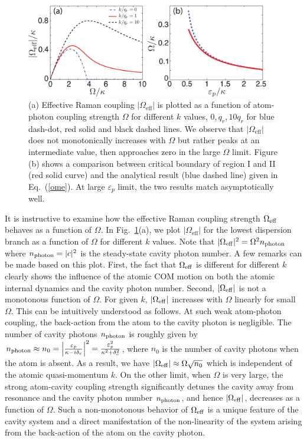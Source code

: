 \documentclass[atoms,article,submit,moreauthors,pdftex,12pt,a4paper]{mdpi}
\begin{document}
\begin{figure}[htp]
\includegraphics[width=0.95\textwidth]{fig2}\caption{(a) Effective Raman coupling $|\Omega_\text{eff}|$ is plotted as a function of atom-photon coupling strength $\Omega$ for different $k$ values, $0$,\,$q_r$,\,$10q_r$ for blue dash-dot, red solid and black dashed  lines. We observe that $|\Omega_\text{eff}|$ does not monotonically  increases with $\Omega$ but rather peaks at an intermediate value, then approaches zero in the large $\Omega$ limit. Figure (b) shows a comparison between critical boundary of region I and II (red solid curve) and the analytical result (blue dashed line) given in Eq.~(\ref{ome}). At large $\varepsilon_p$ limit, the two results match asymptotically well.  }\label{fig2}
\end{figure}

It is instructive to examine how the effective Raman coupling strength $\Omega_{\rm eff}$ behaves as a function of $\Omega$. In Fig.~\ref{fig2}(a), we plot $|\Omega_\text{eff}|$ for the lowest dispersion branch as a function of $\Omega$ for different $k$ values. Note that $|\Omega_{\rm eff}|^2 = \Omega^2 n_{\rm photon}$ where $n_{\rm photon}=|c|^2$ is the steady-state cavity photon number. A few remarks can be made based on this plot. First, the fact that $\Omega_{\rm eff}$ is different for different $k$ clearly shows the influence of the atomic COM motion on both the atomic internal dynamics and the cavity photon number. Second, $|\Omega_{\rm eff}|$ is not a monotonous function of $\Omega$. For given $k$, $|\Omega_{\rm eff}|$ increases with $\Omega$ linearly for small $\Omega$. This can be intuitively understood as follows. At such weak atom-photon coupling, the back-action from the atom to the cavity photon is negligible. The number of cavity photons $n_{\rm photon}$ is roughly given by $n_{\rm photon} \approx n_0=\left|\frac{\varepsilon_{p}}{\kappa-i\delta_{c}}\right|^2= \frac{\varepsilon_p^2}{\kappa^2+ \delta_c^2}$, where $n_0$ is the number of cavity photons when the atom is absent. As a result, we have $|\Omega_{\rm eff}| \approx \Omega \sqrt{n_0}$ which is independent of the atomic quasi-momentum $k$. On the other limit, when $\Omega$ is very large, the strong atom-cavity coupling strength significantly detunes the cavity away from resonance and the cavity photon number $n_{\rm photon}$, and hence $|\Omega_{\rm eff}|$, decreases as a function of $\Omega$. Such a non-monotonous behavior of $\Omega_{\rm eff}$ is a unique feature of the cavity system and a direct manifestation of the non-linearity of the system arising from the back-action of the atom on the cavity photon.  
\end{document}
